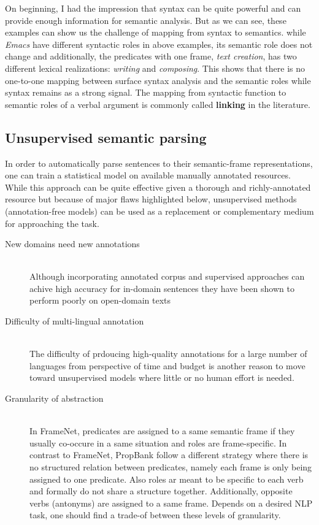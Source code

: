 On beginning, I had the impression that syntax can be quite powerful and
can provide enough information for semantic analysis. But as we can see, these
examples can show us the challenge of mapping from syntax to semantics.
while \emph{Emacs} have different syntactic roles in above examples, its
semantic role does not change and additionally, the predicates with one frame,
\emph{text creation}, has two different lexical realizations: \emph{writing} and
\emph{composing}.
This shows that there is no one-to-one mapping between surface syntax analysis and the semantic roles while syntax remains as a strong signal. The mapping
from syntactic function to semantic roles of a verbal argument is commonly 
called \textbf{linking} in the literature.
   
\subsection{Unsupervised semantic parsing}
\label{ssec:usp-sem-parse}
In order to automatically parse sentences to their semantic-frame
representations, one can train a statistical model on available
manually annotated resources.
While this approach can be quite effective given a thorough and richly-annotated
resource but because of major flaws highlighted below, unsupervised methods
(annotation-free models) can be used as a replacement or complementary medium
for approaching the task.

\begin{description}
\item[New domains need new annotations] \hfil \\ Although incorporating
annotated corpus and supervised approaches can achive high accuracy for in-domain sentences 
they have been
shown to perform poorly on open-domain texts 
\item[Difficulty of multi-lingual annotation] \hfil \\ The difficulty
of prdoucing high-quality annotations for a large number of languages from
perspective of time and budget is another reason to move toward unsupervised
models where little or no human effort is needed.
\item[Granularity of abstraction] \hfil \\ In FrameNet, predicates are assigned
to a same semantic frame if they usually co-occure in a same situation and roles are
frame-specific. In contrast to FrameNet, PropBank follow a different strategy
where there is no structured relation between predicates, namely each frame is
only being assigned to one predicate.
Also roles ar meant to be specific to each verb and formally do not share a
structure together. Additionally, opposite verbs (antonyms) are assigned to a
same frame. Depends on a desired NLP task, one should find a trade-of between
these levels of granularity.

\end{description}

